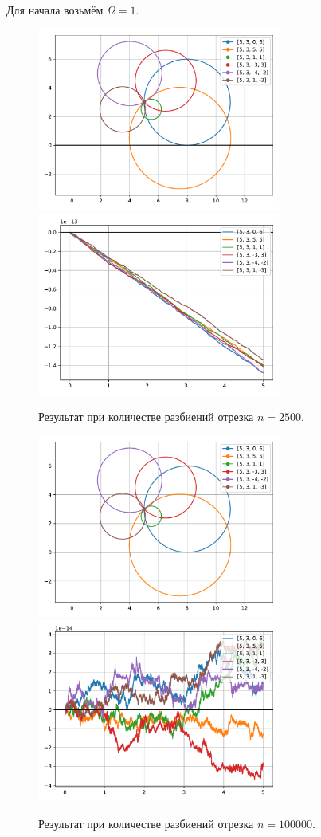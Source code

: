         Для начала возьмём \( \Omega = 1 \).
        \begin{figure}[H]
            \centering
            \includegraphics[width=8cm]{pictures/w1_3plot.pdf}
            \includegraphics[width=8cm]{pictures/w1_3conv.pdf}
            \caption{Результат при количестве разбиений отрезка \( n = 2500 \).} \label{w1e3}
        \end{figure}

        \begin{figure}[H]
            \centering
            \includegraphics[width=8cm]{pictures/w1_3plot.pdf}
            \includegraphics[width=8cm]{pictures/w1_5conv.pdf}
            \caption{Результат при количестве разбиений отрезка \( n = 100000 \).} \label{w1e5}
        \end{figure}


